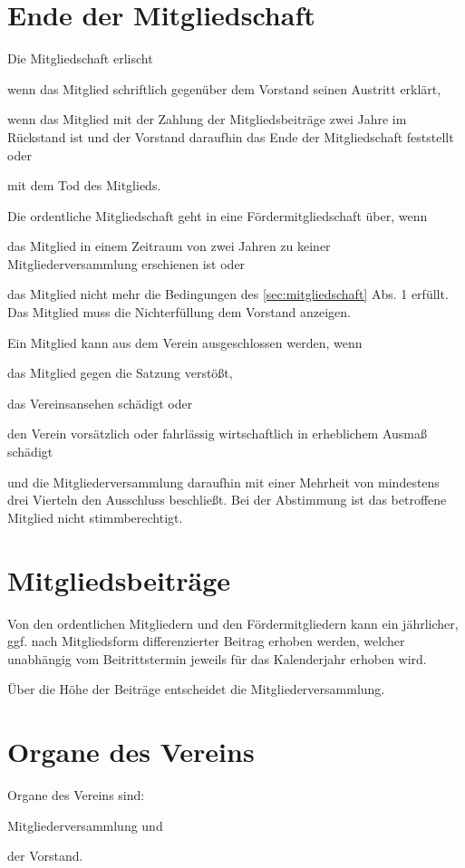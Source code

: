\section{Ende der Mitgliedschaft}\label{sec:ende_der_mitgliedschaft}
\begin{absätze}
    \item Die Mitgliedschaft erlischt
    \begin{sätze}
        \item wenn das Mitglied schriftlich gegenüber dem Vorstand seinen Austritt erklärt,
        \item wenn das Mitglied mit der Zahlung der Mitgliedsbeiträge zwei Jahre im Rückstand ist und der Vorstand daraufhin das Ende der Mitgliedschaft feststellt oder
        \item mit dem Tod des Mitglieds.
    \end{sätze}
    \item Die ordentliche Mitgliedschaft geht in eine Fördermitgliedschaft über, wenn
    \begin{sätze}
        \item das Mitglied in einem Zeitraum von zwei Jahren zu keiner Mitgliederversammlung erschienen ist oder
        \item das Mitglied nicht mehr die Bedingungen des \ref{sec:mitgliedschaft} Abs. 1 erfüllt. Das Mitglied muss die Nichterfüllung dem Vorstand anzeigen.
    \end{sätze}
    \item Ein Mitglied kann aus dem Verein ausgeschlossen werden, wenn
    \begin{sätze}
        \item das Mitglied gegen die Satzung verstößt,
        \item das Vereinsansehen schädigt oder
        \item den Verein vorsätzlich oder fahrlässig wirtschaftlich in erheblichem Ausmaß schädigt
    \end{sätze}
    und die Mitgliederversammlung daraufhin mit einer Mehrheit von mindestens drei Vierteln den Ausschluss beschließt. Bei der Abstimmung ist das betroffene Mitglied nicht stimmberechtigt.
	\end{absätze}

\section{Mitgliedsbeiträge}
	\begin{absätze}
		\item Von den ordentlichen Mitgliedern und den Fördermitgliedern kann ein jährlicher, ggf. nach Mitgliedsform differenzierter Beitrag erhoben werden, welcher unabhängig vom Beitrittstermin jeweils für das Kalenderjahr erhoben wird.
		\item Über die Höhe der Beiträge entscheidet die Mitgliederversammlung.
	\end{absätze}

\section{Organe des Vereins}
    Organe des Vereins sind:
	\begin{compactenum}
		\item Mitgliederversammlung und
		\item der Vorstand.
	\end{compactenum}
